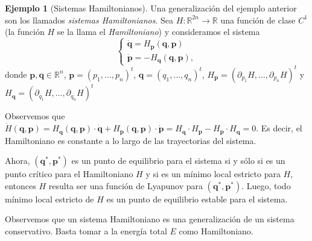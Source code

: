 \documentclass[12pt, a4paper]{amsbook}
\newcommand{\R}{{\mathbb R}}
\newcommand{\pp}{{\mathbf p}}
\newcommand{\qq}{{\mathbf q}}
\theoremstyle{remark}
\theoremstyle{definition}
\newtheorem{ejem}[teo]{Ejemplo}
\numberwithin{section}{chapter}
\numberwithin{subsection}{section}
\numberwithin{equation}{section}
\numberwithin{figure}{chapter}
\begin{document}
 
\begin{ejem}[Sistemas Hamiltonianos]
Una generalización del ejemplo anterior son los llamados {\em sistemas Hamiltonianos}. Sea $H\colon \R^{2n}\to \R$ una función de clase $C^1$ (la función $H$ se la llama el {\em Hamiltoniano}) y consideramos el sistema
$$
\begin{cases}
\dot \qq = H_{\pp}(\qq, \pp)\\
\dot \pp = -H_{\qq}(\qq, \pp),
\end{cases}
$$
donde $\pp, \qq\in \R^n$, $\pp = (p_1,\dots,p_n)^t$, $\qq=(q_1,\dots,q_n)^t$, $H_{\pp} = (\partial_{p_1} H,\dots, \partial_{p_n}H)^t$ y $H_{\qq} = (\partial_{q_1} H,\dots, \partial_{q_n}H)^t$

Observemos que $\dot H(\qq, \pp) = H_{\qq}(\qq, \pp)\cdot \dot\qq + H_{\pp}(\qq, \pp)\cdot \dot\pp = H_{\qq}\cdot H_{\pp} - H_{\pp}\cdot H_{\qq} = 0$. Es decir, el Hamiltoniano es constante a lo largo de las trayectorias del sistema.

Ahora, $(\qq^*, \pp^*)$ es un punto de equilibrio para el sistema si y sólo si es un punto crítico para el Hamiltoniano $H$ y si es un mínimo local estricto para $H$, entonces $H$ resulta ser una función de Lyapunov para $(\qq^*, \pp^*)$. Luego, todo mínimo local estricto de $H$ es un punto de equilibrio estable para el sistema.

Observemos que un sistema Hamiltoniano es una generalización de un sistema conservativo. Basta tomar a la energía total $E$ como Hamiltoniano.
\end{ejem}
\end{document}
